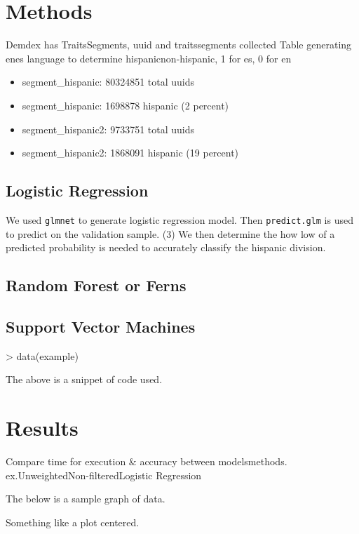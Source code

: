 \documentclass[a4paper]{article}
\begin{document}
\begin{multicols}{2}
\section*{Methods}
Demdex has Traits\/Segments, uuid and traits\/segments collected
Table generating en\/es language to determine hispanic\/non-hispanic, 1 for es, 0 for en
\begin{itemize}
  \item segment\_hispanic: 80324851 total uuids
  \item segment\_hispanic: 1698878 hispanic (2 percent)
  \item segment\_hispanic2: 9733751 total uuids
  \item segment\_hispanic2: 1868091 hispanic (19 percent)
\end{itemize}

\subsection*{Logistic Regression}
We used \texttt{glmnet} to generate logistic regression model.
Then \texttt{predict.glm} is used to predict on the validation sample.
(3) We then determine the how low of a predicted probability is needed to accurately classify the hispanic division.

\subsection*{Random Forest or Ferns}

\subsection*{Support Vector Machines}

\begin{Schunk}
\begin{Sinput}
> data(example)
\end{Sinput}
\end{Schunk}
The above is a snippet of code used. 

\section*{Results}
Compare time for execution \& accuracy between models\/methods. ex.Unweighted\/Non-filtered\/Logistic Regression

The below is a sample graph of data.
\begin{center}
Something like a plot centered.
\end{center}


\end{multicols}
\end{document}
